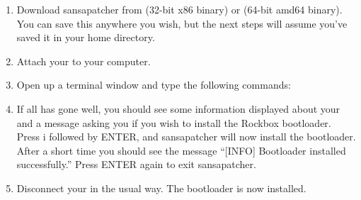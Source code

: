 \begin{enumerate}

\item Download sansapatcher from
 (32-bit x86 
binary) or  
(64-bit amd64 binary). You can save this anywhere you wish, but the next 
steps will assume you've saved it in your home directory.

\item Attach your \dap{} to your computer.

\item Open up a terminal window and type the following commands:



\item If all has gone well, you should see some information displayed about
your \playertype{} and a message asking you if you wish to install the Rockbox
bootloader. Press i followed by ENTER, and sansapatcher will now install the
bootloader. After a short time you should see the message ``[INFO] Bootloader
installed successfully.'' Press ENTER again to exit sansapatcher.

\item Disconnect your \dap{} in the usual way. The bootloader is now installed.

\end{enumerate}
